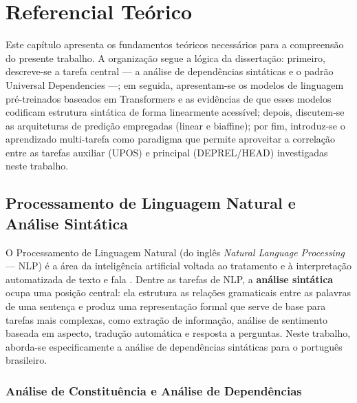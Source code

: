 
\chapter{Referencial Teórico}
\label{cap:referencial}

Este capítulo apresenta os fundamentos teóricos necessários para a compreensão do presente
trabalho. A organização segue a lógica da dissertação: primeiro, descreve-se a tarefa central
— a análise de dependências sintáticas e o padrão Universal Dependencies —; em seguida,
apresentam-se os modelos de linguagem pré-treinados baseados em Transformers e as
evidências de que esses modelos codificam estrutura sintática de forma linearmente acessível;
depois, discutem-se as arquiteturas de predição empregadas (linear e biaffine); por fim,
introduz-se o aprendizado multi-tarefa como paradigma que permite aproveitar a correlação entre
as tarefas auxiliar (UPOS) e principal (DEPREL/HEAD) investigadas neste trabalho.

\section{Processamento de Linguagem Natural e Análise Sintática}
\label{sec:pln}

O Processamento de Linguagem Natural (do inglês \textit{Natural Language Processing} —
NLP) é a área da inteligência artificial voltada ao tratamento e à interpretação automatizada de
texto e fala \cite{jurafsky2023speech}. Dentre as tarefas de NLP, a \textbf{análise sintática}
ocupa uma posição central: ela estrutura as relações gramaticais entre as palavras de uma
sentença e produz uma representação formal que serve de base para tarefas mais complexas,
como extração de informação, análise de sentimento baseada em aspecto, tradução automática e
resposta a perguntas. Neste trabalho, aborda-se especificamente a análise de dependências
sintáticas para o português brasileiro.

\subsection{Análise de Constituência e Análise de Dependências}
\label{subsec:tipos-analise}

